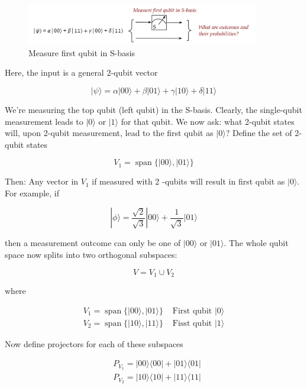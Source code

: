 \documentclass[main.tex]{subfiles}
\begin{document}
    \begin{figure}
        \centering
        \includegraphics[width=4in]{notes/figs/n07/07measure6.png}
        \caption{Measure first qubit in S-basis}
        \label{fig:07measure6}
    \end{figure}
    
    Here, the input is a general 2-qubit vector
    
    $$
    |\psi\rangle=\alpha|00\rangle+\beta|01\rangle+\gamma|10\rangle+\delta|11\rangle
    $$
    
    We're measuring the top qubit (left qubit) in the S-basis. Clearly, the single-qubit measurement leads to $|0\rangle$ or $|1\rangle$ for that qubit. We now ask: what 2-qubit states will, upon 2-qubit measurement, lead to the first qubit as $|0\rangle$? Define the set of 2-qubit states
    
    $$
    V_{1}=\operatorname{span}\{|00\rangle,|01\rangle\}
    $$
    
    Then: Any vector in $V_{1}$ if measured with 2 -qubits will result in first qubit as $|0\rangle$. For example, if
    
    $$
    |\phi\rangle=\frac{\sqrt{2}}{\sqrt{3}}|00\rangle+\frac{1}{\sqrt{3}}|01\rangle
    $$
    
    then a measurement outcome can only be one of $|00\rangle$ or $|01\rangle$. The whole qubit space now splits into two orthogonal subspaces:
    
    $$
    V=V_{1} \cup V_{2}
    $$
    
    where
    
    $$
    \begin{array}{ll}
    V_{1}=\operatorname{span}\{|00\rangle,|01\rangle\} & \text { First qubit }|0\rangle \\
    V_{2}=\operatorname{span}\{|10\rangle,|11\rangle\} & \text { Fisst qubit }|1\rangle
    \end{array}
    $$

    Now define projectors for each of these subspaces
    
    $$
    \begin{aligned}
    &P_{V_{1}}=|00\rangle\langle 00|+| 01\rangle\langle 01| \\
    &P_{V_{2}}=|10\rangle\langle 10|+| 11\rangle\langle 11|
    \end{aligned}
    $$
    
\end{document}
